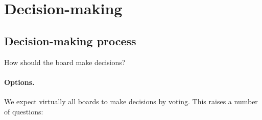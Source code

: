 \documentclass{article}
\begin{document}
\section{Decision-making}\label{Ch:5:decision-making}

\subsection{Decision-making process}\label{Ch:5:1:process}

How should the board make decisions?

\paragraph{Options.} We expect virtually all boards to make decisions by voting. This raises a number of questions:
\end{document}
